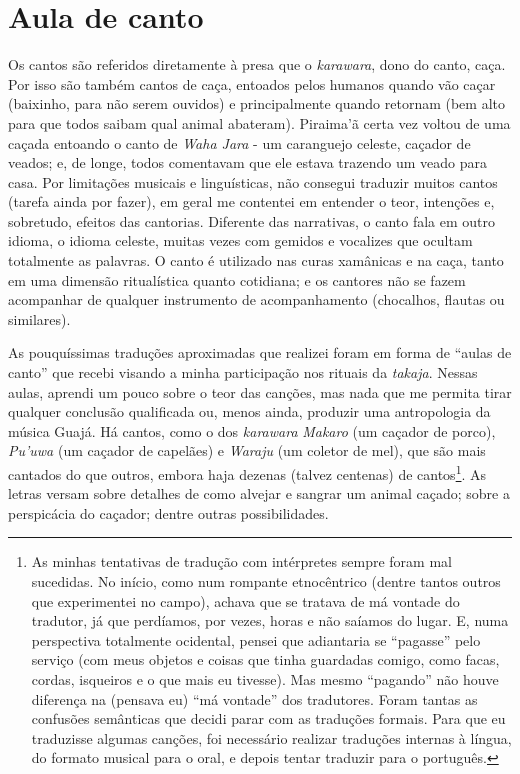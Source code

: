 \section{Aula de canto}

Os cantos são referidos diretamente à presa que o \emph{karawara}, dono
do canto, caça. Por isso são também cantos de caça, entoados pelos
humanos quando vão caçar (baixinho, para não serem ouvidos) e
principalmente quando retornam (bem alto para que todos saibam qual
animal abateram). Piraima'ã certa vez voltou de uma caçada entoando o
canto de \emph{Waha Jara} - um caranguejo celeste, caçador de veados; e,
de longe, todos comentavam que ele estava trazendo um veado para casa.
Por limitações musicais e linguísticas, não consegui traduzir muitos
cantos (tarefa ainda por fazer), em geral me contentei em entender o
teor, intenções e, sobretudo, efeitos das cantorias. Diferente das
narrativas, o canto fala em outro idioma, o idioma celeste, muitas vezes
com gemidos e vocalizes que ocultam totalmente as palavras. O canto é
utilizado nas curas xamânicas e na caça, tanto em uma dimensão
ritualística quanto cotidiana; e os cantores não se fazem acompanhar de
qualquer instrumento de acompanhamento (chocalhos, flautas ou
similares).

As pouquíssimas traduções aproximadas que realizei foram em forma de
``aulas de canto'' que recebi visando a minha participação nos rituais da
\emph{takaja}. Nessas aulas, aprendi um pouco sobre o teor das canções,
mas nada que me permita tirar qualquer conclusão qualificada ou, menos
ainda, produzir uma antropologia da música Guajá. Há cantos, como o dos
\emph{karawara} \emph{Makaro} (um caçador de porco), \emph{Pu'uwa} (um
caçador de capelães) e \emph{Waraju} (um coletor de mel), que são mais
cantados do que outros, embora haja dezenas (talvez centenas) de
cantos\footnote{As minhas tentativas de tradução com intérpretes sempre
  foram mal sucedidas. No início, como num rompante etnocêntrico (dentre
  tantos outros que experimentei no campo), achava que se tratava de má
  vontade do tradutor, já que perdíamos, por vezes, horas e não saíamos
  do lugar. E, numa perspectiva totalmente ocidental, pensei que
  adiantaria se ``pagasse'' pelo serviço (com meus objetos e coisas que
  tinha guardadas comigo, como facas, cordas, isqueiros e o que mais eu
  tivesse). Mas mesmo ``pagando'' não houve diferença na (pensava eu) ``má
  vontade'' dos tradutores. Foram tantas as confusões semânticas que
  decidi parar com as traduções formais. Para que eu traduzisse algumas
  canções, foi necessário realizar traduções internas à língua, do
  formato musical para o oral, e depois tentar traduzir para o
  português.}. As letras versam sobre detalhes de como alvejar e sangrar
um animal caçado; sobre a perspicácia do caçador; dentre outras
possibilidades.

